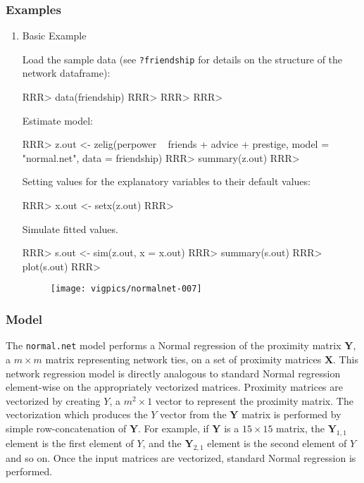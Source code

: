 \subsubsection{Examples}
\begin{enumerate}
\item Basic Example

Load the sample data (see {\tt ?friendship} for details on the structure of the network dataframe):

\begin{Schunk}
\begin{Sinput}
RRR> data(friendship)
RRR> 
RRR> 
RRR> 
\end{Sinput}
\end{Schunk}
Estimate model:

\begin{Schunk}
\begin{Sinput}
RRR> z.out <- zelig(perpower ~ friends + advice + prestige, model = "normal.net", data = friendship)
RRR> summary(z.out)
RRR> 
\end{Sinput}
\end{Schunk}
Setting values for the explanatory variables to their default values:

\begin{Schunk}
\begin{Sinput}
RRR> x.out <- setx(z.out)
RRR> 
\end{Sinput}
\end{Schunk}
Simulate fitted values.
\begin{Schunk}
\begin{Sinput}
RRR> s.out <- sim(z.out, x = x.out) 
RRR> summary(s.out) 
RRR> plot(s.out) 
RRR> 
\end{Sinput}
\end{Schunk}

\begin{figure}[here]
\centering
\texttt{[image: vigpics/normalnet-007]}
\label{fig:plotgam}
\end{figure}

\end{enumerate}



\subsubsection{Model}
The {\tt normal.net} model performs a Normal regression of the proximity matrix $\mathbf{Y}$, a $m \times m$ matrix representing network ties, on a set of proximity matrices $\mathbf{X}$. This network regression model is directly analogous to standard Normal regression element-wise on the appropriately vectorized matrices. Proximity matrices are vectorized by creating $Y$, a $m^2 \times 1$ vector to represent the proximity matrix. The vectorization which produces the $Y$ vector from the $\mathbf{Y}$ matrix is performed by simple row-concatenation of $\mathbf{Y}$. For example, if $\mathbf{Y}$ is a $15 \times 15$ matrix, the $\mathbf{Y}_{1,1}$ element is the first element of $Y$, and the $\mathbf{Y}_{2,1}$ element is the second element of $Y$ and so on. Once the input matrices are vectorized, standard Normal regression is performed. 

